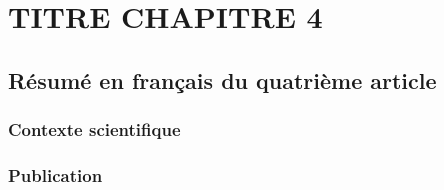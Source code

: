 \chapter{TITRE CHAPITRE 4}
\label{chap4}

\section{Résumé en français du quatrième article}

\subsection{Contexte scientifique}

\subsection{Publication}
